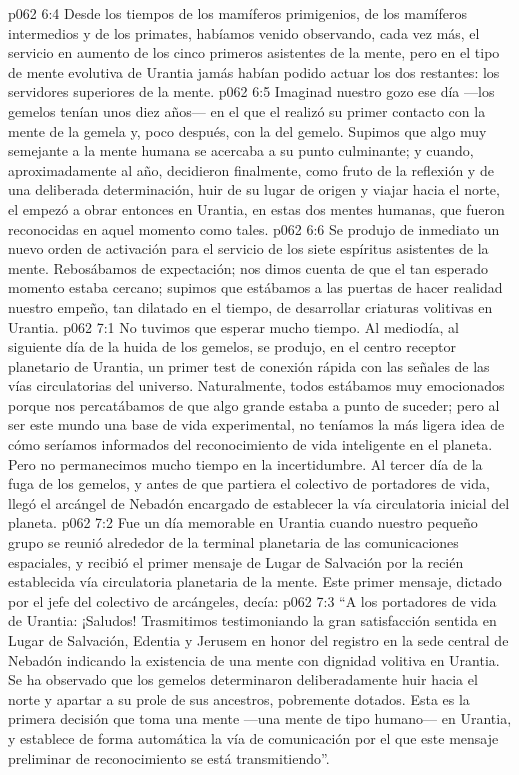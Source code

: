 \vs p062 6:4 Desde los tiempos de los mamíferos primigenios, de los mamíferos intermedios y de los primates, habíamos venido observando, cada vez más, el servicio en aumento de los cinco primeros asistentes de la mente, pero en el tipo de mente evolutiva de Urantia jamás habían podido actuar los dos restantes: los servidores superiores de la mente.
\vs p062 6:5 Imaginad nuestro gozo ese día ---los gemelos tenían unos diez años--- en el que el  realizó su primer contacto con la mente de la gemela y, poco después, con la del gemelo. Supimos que algo muy semejante a la mente humana se acercaba a su punto culminante; y cuando, aproximadamente al año, decidieron finalmente, como fruto de la reflexión y de una deliberada determinación, huir de su lugar de origen y viajar hacia el norte, el  empezó a obrar entonces en Urantia, en estas dos mentes humanas, que fueron reconocidas en aquel momento como tales.
\vs p062 6:6 Se produjo de inmediato un nuevo orden de activación para el servicio de los siete espíritus asistentes de la mente. Rebosábamos de expectación; nos dimos cuenta de que el tan esperado momento estaba cercano; supimos que estábamos a las puertas de hacer realidad nuestro empeño, tan dilatado en el tiempo, de desarrollar criaturas volitivas en Urantia.
\vs p062 7:1 No tuvimos que esperar mucho tiempo. Al mediodía, al siguiente día de la huida de los gemelos, se produjo, en el centro receptor planetario de Urantia, un primer test de conexión rápida con las señales de las vías circulatorias del universo. Naturalmente, todos estábamos muy emocionados porque nos percatábamos de que algo grande estaba a punto de suceder; pero al ser este mundo una base de vida experimental, no teníamos la más ligera idea de cómo seríamos informados del reconocimiento de vida inteligente en el planeta. Pero no permanecimos mucho tiempo en la incertidumbre. Al tercer día de la fuga de los gemelos, y antes de que partiera el colectivo de portadores de vida, llegó el arcángel de Nebadón encargado de establecer la vía circulatoria inicial del planeta.
\vs p062 7:2 Fue un día memorable en Urantia cuando nuestro pequeño grupo se reunió alrededor de la terminal planetaria de las comunicaciones espaciales, y recibió el primer mensaje de Lugar de Salvación por la recién establecida vía circulatoria planetaria de la mente. Este primer mensaje, dictado por el jefe del colectivo de arcángeles, decía:
\vs p062 7:3 “A los portadores de vida de Urantia: ¡Saludos! Trasmitimos testimoniando la gran satisfacción sentida en Lugar de Salvación, Edentia y Jerusem en honor del registro en la sede central de Nebadón indicando la existencia de una mente con dignidad volitiva en Urantia. Se ha observado que los gemelos determinaron deliberadamente huir hacia el norte y apartar a su prole de sus ancestros, pobremente dotados. Esta es la primera decisión que toma una mente ---una mente de tipo humano--- en Urantia, y establece de forma automática la vía de comunicación por el que este mensaje preliminar de reconocimiento se está transmitiendo”.
